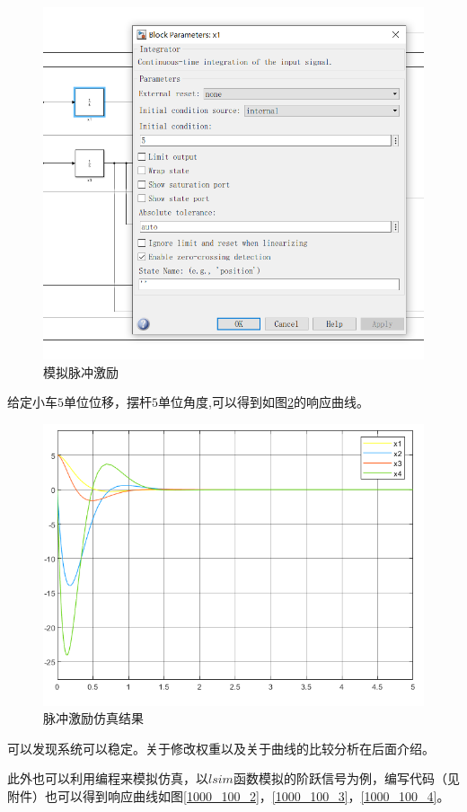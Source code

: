 \begin{figure}[hbpt]
\centering
\includegraphics[width=12cm]{initial.png}
\caption{模拟脉冲激励}\label{initial}
\end{figure}

给定小车$5$单位位移，摆杆$5$单位角度,可以得到如图\ref{1000_100}的响应曲线。

\begin{figure}[hbpt]
\centering
\includegraphics[width=12cm]{1000_100.png}
\caption{脉冲激励仿真结果}\label{1000_100}
\end{figure}

可以发现系统可以稳定。关于修改权重以及关于曲线的比较分析在后面介绍。

此外也可以利用编程来模拟仿真，以$lsim$函数模拟的阶跃信号为例，编写代码（见附件）也可以得到响应曲线如图\ref{1000_100_2}，\ref{1000_100_3}，\ref{1000_100_4}。

